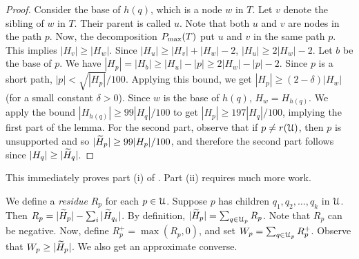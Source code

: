 {\begin{proof}
Consider the base
of $h(q)$, which is a node $w$ in $T$. Let $v$ denote the sibling of $w$ in $T$.
Their parent is called $u$. Note that both $u$ and $v$ are nodes in the path $p$.
Now, the decomposition $P_{\max}(T)$ put $u$ and $v$ in the same path $p$. This
implies $|H_v| \geq |H_w|$. Since $|H_u| \geq |H_v| + |H_w| - 2$,
$|H_u| \geq 2|H_w| - 2$. Let $b$ be the base of $p$.
We have $|H_p| = |H_b| \geq |H_u| - |p| \geq 2|H_w| - |p| - 2$. Since $p$ is a short path, $|p| < \sqrt{|H_p|}/100$.
Applying this bound, we get $|H_p| \geq (2-\delta)|H_w|$ (for a small constant $\delta > 0$).
Since $w$ is the base of $h(q)$, $H_w = H_{h(q)}$. We apply the bound $|H_{h(q)}| \geq 99|H_q|/100$
to get $|H_p| \geq 197|H_q|/100$, implying the first part of the lemma.  For the second part, observe that 
if $p\neq r({\cal U})$, then $p$ is unsupported and so $|\widetilde{H}_p| \geq 99|H_p|/100$, and therefore the second part follows since $|H_q| \geq |\widetilde{H}_q|$.
%
%
\end{proof}

This immediately proves part (i) of . Part (ii) requires much more work.

We define a \emph{residue} $R_p$ for each $p \in {\cal U}$. Suppose $p$ has children
$q_1, q_2, \ldots, q_k$ in ${\cal U}$. Then $R_p = |\widetilde{H}_p| - \sum_i |\widetilde{H}_{q_i}|$. 
By definition, $|\widetilde{H}_p| = \sum_{q \in {\cal U}_p} R_p$. 
Note that $R_p$ can be negative. 
Now, define $R^+_p = \max(R_p,0)$, and set $W_p = \sum_{q \in {\cal U}_p} R^+_p$.
Observe that $W_p \geq |\widetilde{H}_p|$. We also get an approximate converse.


}
